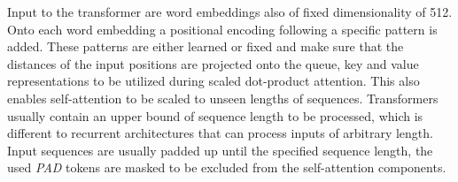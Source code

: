 Input to the transformer are word embeddings also of fixed dimensionality of 512. Onto each word embedding a positional encoding following a specific pattern is added. These patterns are either learned or fixed and make sure that the distances of the input positions are projected onto the queue, key and value representations to be utilized during scaled dot-product attention. This also enables self-attention to be scaled to unseen lengths of sequences. Transformers usually contain an upper bound of sequence length to be pro\-ces\-sed, which is different to recurrent architectures that can process inputs of ar\-bi\-tra\-ry length. Input sequences are usually padded up until the specified sequence length, the used \textit{PAD} tokens are masked to be excluded from the self-attention components. \cite{Alammar2018, Vaswani2017}





\newpage
